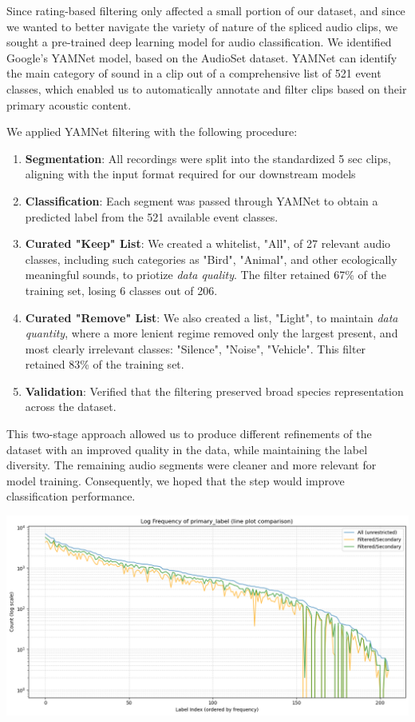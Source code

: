 \documentclass[10pt]{article}
\begin{document}
Since rating-based filtering only affected a small portion of our dataset, and since we wanted to better navigate the variety of nature of the spliced audio clips, we sought a pre-trained deep learning model for audio classification. We identified Google's YAMNet model,  based on the AudioSet dataset. YAMNet can identify the main category of sound in a clip out of a comprehensive list of 521 event classes, which enabled us to automatically annotate and filter clips based on their primary acoustic content.

We applied YAMNet filtering with the following procedure:

\begin{enumerate}
  \item \textbf{Segmentation}: All recordings were split into the standardized 5 sec clips, aligning with the input format required for our downstream models
  \item \textbf{Classification}: Each segment was passed through YAMNet to obtain a predicted label from the 521 available event classes.
  \item \textbf{Curated "Keep" List}: We created a whitelist, "All", of 27 relevant audio classes, including such categories as "Bird", "Animal", and other ecologically meaningful sounds, to priotize \textit{data quality}. The filter retained 67\% of the training set, losing 6 classes out of 206.
  \item \textbf{Curated "Remove" List}: We also created a list, "Light", to maintain \textit{data quantity}, where a more lenient regime removed only the largest present, and most clearly irrelevant classes: "Silence", "Noise", "Vehicle". This filter retained 83\% of the training set.
  \item \textbf{Validation}: Verified that the filtering preserved broad species representation across the dataset.
\end{enumerate}

This two-stage approach allowed us to produce different refinements of the dataset with an improved quality in the data, while maintaining the label diversity. The remaining audio segments were cleaner and more relevant for model training. Consequently, we hoped that the step would improve classification performance.

\begin{center}
  \includegraphics[width=0.5\linewidth]{img/primary_yamnet_filtering.png}
\end{center}
\end{document}
